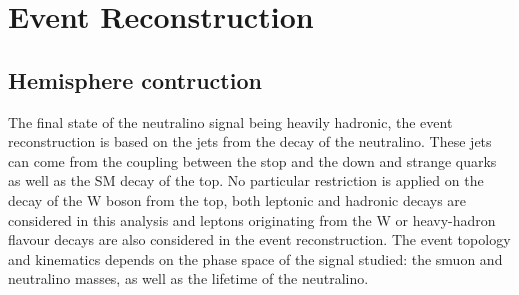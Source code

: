 \documentclass{cernatlasnote}
\begin{document}


\newpage
\section{Event Reconstruction}
\label{SEC: EVTREC}

\subsection{Hemisphere contruction}
The final state of the neutralino signal being heavily hadronic, the event reconstruction is based on the jets from the decay of the neutralino. These jets can come from the coupling between the stop and the down and strange quarks as well as the SM decay of the top. No particular restriction is applied on the decay of the W boson from the top, both leptonic and hadronic decays are considered in this analysis and leptons originating from the W or heavy-hadron flavour decays are also considered in the event reconstruction. The event topology and kinematics depends on the phase space of the signal studied: the smuon and neutralino masses, as well as the lifetime of the neutralino.\\
\end{document}
